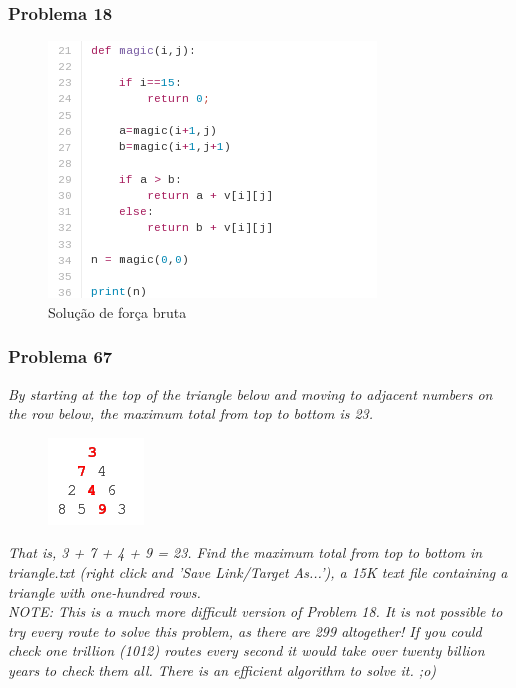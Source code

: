 \documentclass{beamer}
\begin{document}
\begin{frame}
    \frametitle{Problema 18}
    \begin{figure}[htpb]
        \centering
        \includegraphics[width=0.5\linewidth]{images/prob18.png}
        \caption{Solução de força bruta}
    \end{figure}
\end{frame}

\begin{frame}
    \frametitle{Problema 67}

    \begin{center}
        \textit{
            By starting at the top of the triangle below and moving to adjacent numbers on the row below, the maximum total from top to bottom is 23.
        }
        \begin{figure}[htpb]
            \includegraphics[width=0.2\linewidth]{images/p18_1.png}
        \end{figure}
        \textit{
            That is, 3 + 7 + 4 + 9 = 23.
            Find the maximum total from top to bottom in triangle.txt (right click and 'Save Link/Target As...'), a 15K text file containing a triangle with one-hundred rows.\\
        }
        \textit{
            \footnotesize NOTE: This is a much more difficult version of Problem 18. It is not possible to try every route to solve this problem, as there are 299 altogether! If you could check one trillion (1012) routes every second it would take over twenty billion years to check them all. There is an efficient algorithm to solve it. ;o)
        }
    \end{center}

\end{frame}
\end{document}
